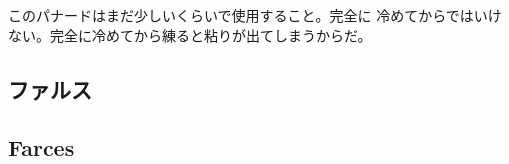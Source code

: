 \begin{recette}
このパナードはまだ少しいくらいで使用すること。完全に
冷めてからではいけない。完全に冷めてから練ると粘りが出てしまうからだ。
\end{recette}
\hypertarget{ux30d5ux30a1ux30ebux30b9}{%
\subsection{ファルス}\label{ux30d5ux30a1ux30ebux30b9}}

\vspace*{-1.7\zw}

\hypertarget{farces}{%
\subsection{Farces}\label{farces}}

 

